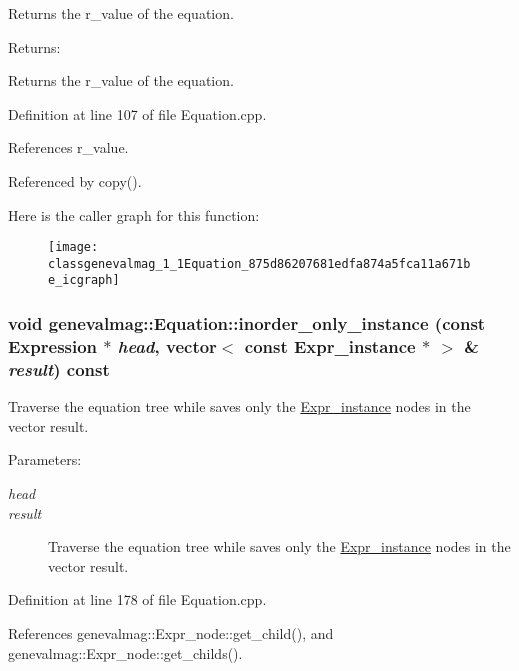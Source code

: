 Returns the r\_\-value of the equation. \begin{Desc}
\item[Returns:]\end{Desc}
Returns the r\_\-value of the equation. 

Definition at line 107 of file Equation.cpp.

References r\_\-value.

Referenced by copy().

Here is the caller graph for this function:\nopagebreak
\begin{figure}[H]
\begin{center}
\leavevmode
\texttt{[image: classgenevalmag\_1\_1Equation\_875d86207681edfa874a5fca11a671be\_icgraph]}
\end{center}
\end{figure}
\hypertarget{classgenevalmag_1_1Equation_34b874554d9ed47d37473ae4dab5d16e}{
\subsubsection[{inorder\_\-only\_\-instance}]{\setlength{\rightskip}{0pt plus 5cm}void genevalmag::Equation::inorder\_\-only\_\-instance (const {\bf Expression} $\ast$ {\em head}, \/  vector$<$ const {\bf Expr\_\-instance} $\ast$ $>$ \& {\em result}) const}}
\label{classgenevalmag_1_1Equation_34b874554d9ed47d37473ae4dab5d16e}


Traverse the equation tree while saves only the \hyperlink{classgenevalmag_1_1Expr__instance}{Expr\_\-instance} nodes in the vector result. \begin{Desc}
\item[Parameters:]
\begin{description}
\item[{\em head}]\item[{\em result}]Traverse the equation tree while saves only the \hyperlink{classgenevalmag_1_1Expr__instance}{Expr\_\-instance} nodes in the vector result. \end{description}
\end{Desc}


Definition at line 178 of file Equation.cpp.

References genevalmag::Expr\_\-node::get\_\-child(), and genevalmag::Expr\_\-node::get\_\-childs().


